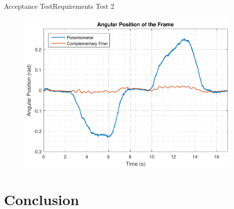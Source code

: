 \begin{frame}{Acceptance Test}{Requirements Test 2}
%	
\begin{figure}
	\centering
	\includegraphics[scale=0.6]{Pictures/testReq2.pdf}
\end{figure}
\end{frame}

\section{Conclusion}

